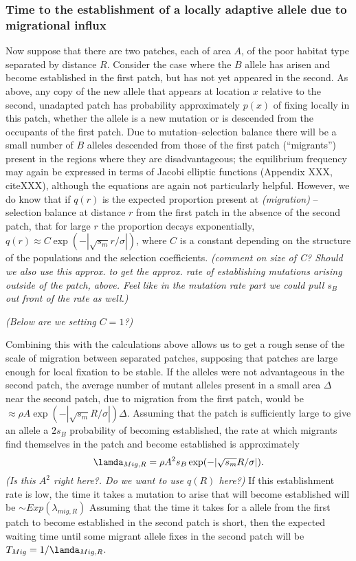 \documentclass{article}
\newcommand{\gc}[1]{{ \it \color{green} (#1) } }
\begin{document}
\subsubsection{Time to the establishment of a locally adaptive allele
  due to migrational influx}
\label{ss:patchymigration}
Now suppose that there are two patches, each of area $A$, of the poor
habitat type separated by distance $R$. Consider the case where the
$B$ allele has arisen and become established in the first patch, but has not yet appeared in the second.
As above, any copy of the new allele that appears at location $x$ relative to the second, unadapted patch 
has probability approximately $p(x)$ of fixing locally in this patch,
whether the allele is a new mutation or is descended from the occupants of the first patch.
Due to mutation--selection balance there will be a small number of $B$ alleles descended from those of the first patch (``migrants'') 
present in the regions where they are disadvantageous;
the equilibrium frequency may again be expressed in terms of Jacobi elliptic functions (Appendix XXX, citeXXX),
although the equations are again not particularly helpful.
However, we do know that if $q(r)$ is the expected proportion present at \gc{migration}--selection balance at distance $r$ from the first patch
in the absence of the second patch, that for large $r$ the proportion decays exponentially, $q(r) \approx C \exp( -|\sqrt{s_m} r / \sigma|)$,
where $C$ is a constant depending on the structure of the populations
and the selection coefficients. \gc{comment on size of C? Should we
  also use this approx. to get the approx. rate of establishing mutations
  arising outside of the patch, above. Feel like in the mutation rate
  part we could pull $s_B$ out front of the rate as well.} 

\gc{Below are we setting $C=1$?}

Combining this with the calculations above allows us to get a rough sense of the scale of migration between separated patches,
supposing that patches are large enough for local fixation to be stable. If the alleles were not advantageous in the second patch,
the average number of mutant alleles present in a small area $\Delta$
near the second patch, due
to migration from the first patch, would be $\approx \rho A \exp( -
|\sqrt{s_m} R/\sigma| ) \Delta$. Assuming that the patch is
sufficiently large to give an allele a $2s_B$ probability of becoming established, the rate at which migrants find
themselves in the patch and become established  is approximately
\begin{equation}
\lamda_{Mig,R} = \rho A^2 s_B \exp( -|\sqrt{s_m} R/\sigma| ).
\end{equation}
\gc{Is this $A^2$ right here?. Do we want to use $q(R)$ here?}
If this establishment rate is low, the time it takes
a mutation to arise that will become established will be  $\sim Exp(\lambda_{mig,R})$
Assuming that the time it takes for a allele from the first patch to
become established in the second patch is short,
then  the expected waiting time until some migrant allele fixes in the
second patch will be $T_{Mig} = 1/\lamda_{Mig,R} $.
\end{document}
